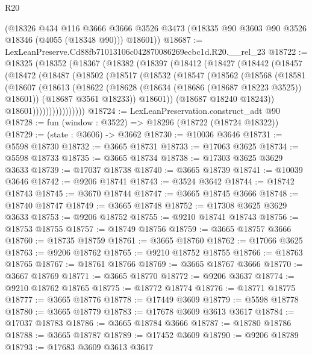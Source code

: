 \begin{lexlean}{R20}
\begin{coremodule}
      (@18326
        @434
        @116
        @3666
        @3666
        @3526
        @3473
        (@18335 @90 @3603 @90 @3526 @18346 (@4055 (@18348 @90)))
        @18601))
@18687 := LexLeanPreserve.Cd88fb71013106c042870086269ecbc1d.R20.__rel_23
@18722 := @18325
    (@18352
      (@18367
        (@18382
          (@18397
            (@18412
              (@18427
                (@18442
                  (@18457
                    (@18472
                      (@18487
                        (@18502
                          (@18517
                            (@18532
                              (@18547
                                (@18562
                                  (@18568
                                    (@18581
                                      (@18607
                                        (@18613
                                          (@18622
                                            (@18628 (@18634 (@18686 (@18687 @18223 @3525)) @18601))
                                            (@18687 @3561 @18233))
                                          @18601))
                                      (@18687 @18240 @18243))
                                    @18601))))))))))))))))
@18724 := LexLeanPreservation.construct_adt @90
@18728 := fun (window : @3522) => @18296 (@18722 (@18724 @18322))
@18729 := (state : @3606) -> @3662
@18730 := @10036 @3646
@18731 := @5598 @18730
@18732 := @3665 @18731
@18733 := @17063 @3625
@18734 := @5598 @18733
@18735 := @3665 @18734
@18738 := @17303 @3625 @3629 @3633
@18739 := @17037 @18738
@18740 := @3665 @18739
@18741 := @10039 @3646
@18742 := @9206 @18741
@18743 := @3524 @3642
@18744 := @18742 @18743
@18745 := @3670 @18744
@18747 := @3665 @18745 @3666
@18748 := @18740 @18747
@18749 := @3665 @18748
@18752 := @17308 @3625 @3629 @3633
@18753 := @9206 @18752
@18755 := @9210 @18741 @18743
@18756 := @18753 @18755
@18757 := @18749 @18756
@18759 := @3665 @18757 @3666
@18760 := @18735 @18759
@18761 := @3665 @18760
@18762 := @17066 @3625
@18763 := @9206 @18762
@18765 := @9210 @18752 @18755
@18766 := @18763 @18765
@18767 := @18761 @18766
@18769 := @3665 @18767 @3666
@18770 := @3667 @18769
@18771 := @3665 @18770
@18772 := @9206 @3637
@18774 := @9210 @18762 @18765
@18775 := @18772 @18774
@18776 := @18771 @18775
@18777 := @3665 @18776
@18778 := @17449 @3609
@18779 := @5598 @18778
@18780 := @3665 @18779
@18783 := @17678 @3609 @3613 @3617
@18784 := @17037 @18783
@18786 := @3665 @18784 @3666
@18787 := @18780 @18786
@18788 := @3665 @18787
@18789 := @17452 @3609
@18790 := @9206 @18789
@18793 := @17683 @3609 @3613 @3617

\end{coremodule}
\end{lexlean}
